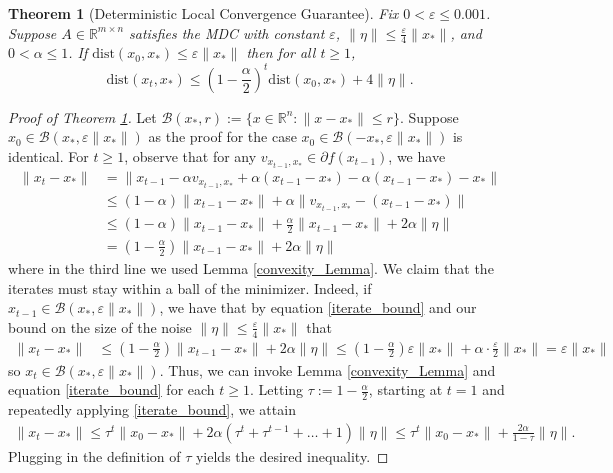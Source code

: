 \documentclass[11pt]{article}
\newcommand{\R}{\mathbb{R}}
\newcommand{\al}{\alpha}
\renewcommand{\epsilon}{\varepsilon}
\newcommand{\Bcal}{\mathcal{B}}
\newcommand{\dist}{\text{dist}}
\newtheorem{theorem}{Theorem}
\begin{document}
\begin{theorem}[Deterministic Local Convergence Guarantee] \label{conv_to_min} 
Fix $0 < \epsilon \leqslant 0.001$. Suppose $A \in \R^{m \times n}$ satisfies the MDC with constant $\epsilon$, $\|\eta\| \leqslant \frac{\epsilon}{4}\|x_*\|$, and $0 < \al \leqslant 1$. If  $\dist(x_0,x_*)\leqslant\epsilon\|x_*\|$ then for all $t \geqslant 1$, $$\dist(x_{t},x_*) \leqslant \left(1 - \frac{\al}{2}\right)^{t}\dist(x_0,x_*) + 4\|\eta\|.$$
\end{theorem}
\begin{proof}[Proof of Theorem \ref{conv_to_min}] Let $\Bcal(x_*,r) := \{x \in \R^n : \|x-x_*\|\leqslant r\}$. 
Suppose $x_0 \in \mathcal{B}(x_*,\epsilon\|x_*\|)$ as the proof for the case $x_0 \in \mathcal{B}(-x_*,\epsilon\|x_*\|)$ is identical. For $t \geqslant 1$, observe that for any $v_{x_{t-1},x_*} \in \partial f(x_{t-1})$, we have \begin{align}
    \|x_{t} - x_*\| & = \|x_{t-1} - \al v_{x_{t-1},x_*} + \al(x_{t-1}-x_*) - \al(x_{t-1}-x_*) - x_*\| \nonumber\\
    & \leqslant \left(1-\al\right)\|x_{t-1}-x_*\| + \al\|v_{x_{t-1},x_*} - (x_{t-1}-x_*)\| \nonumber\\
    & \leqslant \left(1-\al\right)\|x_{t-1}-x_*\| + \frac{\al}{2}\|x_{t-1}-x_*\| + 2\al\|\eta\| \nonumber\\
    & = \left(1 - \frac{\al}{2}\right)\|x_{t-1}-x_*\| + 2\al\|\eta\| \label{iterate_bound}
\end{align} where in the third line we used Lemma \ref{convexity_Lemma}. We claim that the iterates must stay within a ball of the minimizer. Indeed, if $x_{t-1} \in \Bcal(x_*,\epsilon\|x_*\|)$, we have that by equation \eqref{iterate_bound} and our bound on the size of the noise $\|\eta\| \leqslant \frac{\epsilon}{4}\|x_*\|$ that \begin{align*}
    \|x_t-x_*\| & \leqslant \left(1 - \frac{\al}{2}\right)\|x_{t-1}-x_*\| + 2\al\|\eta\| \leqslant \left(1 - \frac{\al}{2}\right)\epsilon \|x_*\| + \al\cdot\frac{\epsilon}{2}\|x_*\| = \epsilon\|x_*\|
\end{align*} so $x_t \in \Bcal(x_*,\epsilon\|x_*\|)$. Thus, we can invoke Lemma \ref{convexity_Lemma} and equation \eqref{iterate_bound} for each $t \geqslant 1$. Letting $\tau := 1-\frac{\al}{2}$, starting at $t = 1$ and repeatedly applying \eqref{iterate_bound}, we attain \begin{align*}
    \|x_{t} - x_*\|  \leqslant \tau^t\|x_{0}-x_*\| + 2\al(\tau^t + \tau^{t-1} + \dots + 1)\|\eta\| \leqslant \tau^t\|x_{0}-x_*\| + \frac{2\al}{1-\tau}\|\eta\|.
\end{align*} Plugging in the definition of $\tau$ yields the desired inequality.
\end{proof}
\end{document}
